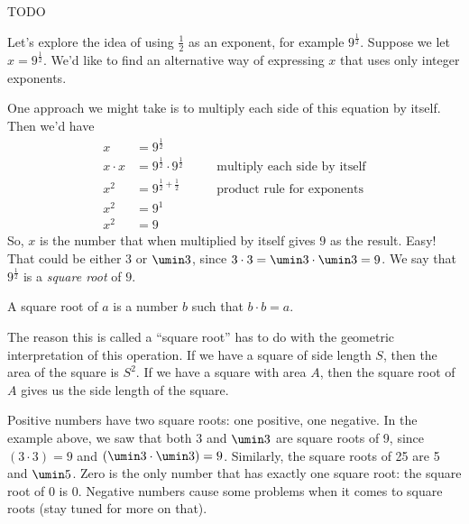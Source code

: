 \begin{boxedexplore}
TODO
\end{boxedexplore}


Let's explore the idea of using $\frac{1}{2}$ as an exponent, for example $9^{\frac{1}{2}}$. Suppose we let $x = 9^{\frac{1}{2}}$. We'd like to find an alternative way of expressing $x$ that uses only integer exponents.

One approach we might take is to multiply each side of this equation by itself. Then we'd have
\[\begin{aligned}
x 			&= 9^{\frac{1}{2}}\\
x\cdot x 	&= 9^{\frac{1}{2}} \cdot 9^{\frac{1}{2}}
&&\quad\text{multiply each side by itself}\\
x^2			&= 9^{\frac{1}{2}+\frac{1}{2}}
&&\quad\text{product rule for exponents}\\
x^2		&= 9^{1}\\
x^2		&= 9
\end{aligned}\]
So, $x$ is the number that when multiplied by itself gives $9$ as the result. Easy! That could be either $3$ or $\umin3$, since $3\cdot 3 = \umin3 \cdot \umin3 = 9$. We say that $9^{\frac{1}{2}}$ is a \textit{square root} of $9$.

\begin{boxeddef}
A \gls{square root} of $a$ is a number $b$ such that $b \cdot b = a$.
\end{boxeddef}

The reason this is called a ``square root'' has to do with the geometric interpretation of this operation. If we have a square of side length $S$, then the area of the square is $S^2$. If we have a square with area $A$, then the square root of $A$ gives us the side length of the square. 

\begin{center}\end{center}

Positive numbers have two square roots: one positive, one negative. In the example above, we saw that both 3 and $\umin3$ are square roots of 9, since $(3 \cdot 3) = 9$ and $(\umin3 \cdot \umin3) = 9$. Similarly, the square roots of 25 are 5 and $\umin5$. Zero is the only number that has exactly one square root: the square root of 0 is 0. Negative numbers cause some problems when it comes to square roots (stay tuned for more on that).

